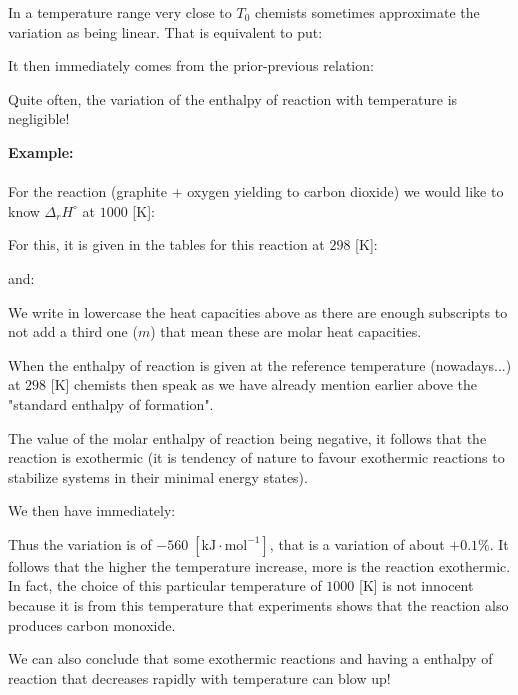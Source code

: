 	In a temperature range very close to $T_0$ chemists sometimes approximate the variation as being linear. That is equivalent to put:
	
	It then immediately comes from the prior-previous relation:
	
	\begin{tcolorbox}[title=Remark,colframe=black,arc=10pt]
	Quite often, the variation of the enthalpy of reaction with temperature is negligible!
	\end{tcolorbox}
	\begin{tcolorbox}[colframe=black,colback=white,sharp corners]
	\textbf{{\Large {}}Example:}\\\\
	For the reaction (graphite + oxygen yielding to carbon dioxide) we would like to know $\Delta_r H^\circ$ at $1000$ [K]:
	
	For this, it is given in the tables for this reaction at $298$ [K]:
	
	and:
	
	We write in lowercase the heat capacities above as there are enough subscripts to not add a third one ($m$) that mean these are molar heat capacities.
	\begin{tcolorbox}[title=Remark,colframe=black,arc=10pt]
	When the enthalpy of reaction is given at the reference temperature (nowadays...) at $298$ [K] chemists then speak as we have already mention earlier above the "standard enthalpy of formation".
	\end{tcolorbox}
	The value of the molar enthalpy of reaction being negative, it follows that the reaction is exothermic (it is tendency of nature to favour exothermic reactions to stabilize systems in their minimal energy states).
	\end{tcolorbox}
	
	\begin{tcolorbox}[colframe=black,colback=white,sharp corners]
	We then have immediately:
	
	Thus the variation is of $-560\;[\text{kJ}\cdot \text{mol}^{-1}]$, that is a variation of about $+0.1\%$. It follows that the higher the temperature increase, more is the reaction exothermic. In fact, the choice of this particular temperature of $1000$ [K] is not innocent because it is from this temperature that experiments shows that the reaction also produces carbon monoxide.
	\end{tcolorbox}
	We can also conclude that some exothermic reactions and having a enthalpy of reaction that decreases rapidly with temperature can blow up!
	
